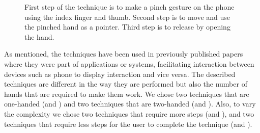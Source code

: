 \begin{figure}[H]
\caption{\protect{} First step of the \pinch technique is to make a pinch gesture on the phone using the index finger and thumb. \protect{} Second step is to move and use the pinched hand as a pointer. \protect{} Third step is to release by opening the hand.}
\label{fig:pinchTechnique}
\end{figure}

As mentioned, the techniques have been used in previously published papers where they were part of applications or systems, facilitating interaction between devices such as phone to display interaction and vice versa. 
The described techniques are different in the way they are performed but also the number of hands that are required to make them work.
We chose two techniques that are one-handed (\swipe and \tilt) and two techniques that are two-handed (\throw and \pinch).
Also, to vary the complexity we chose two techniques that require more steps (\throw and \pinch), and two techniques that require less steps for the user to complete the technique (\swipe and \tilt).

